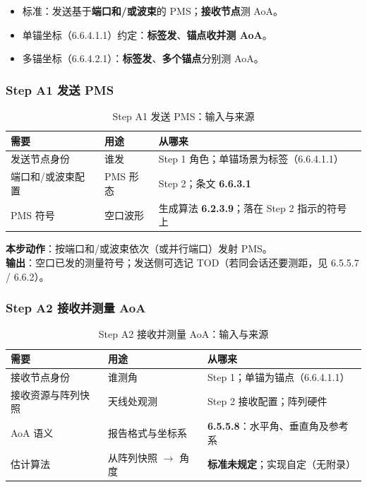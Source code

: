 \documentclass[11pt,a4paper]{ctexart}
\begin{document}
\begin{itemize}[nosep]
  \item 标准：发送基于\textbf{端口和/或波束}的 PMS；\textbf{接收节点}测 AoA。
  \item 单锚坐标（6.6.4.1.1）约定：\textbf{标签发}、\textbf{锚点收并测 AoA}。
  \item 多锚坐标（6.6.4.2.1）：\textbf{标签发}、\textbf{多个锚点}分别测 AoA。
\end{itemize}

\subsubsection{Step A1 发送 PMS}

\begin{longtable}{L{3.2cm}L{5.0cm}L{4.8cm}}
\caption{Step A1 发送 PMS：输入与来源\label{tab:step114}} \\
\toprule
\textbf{需要} & \textbf{用途} & \textbf{从哪来} \\
\midrule
发送节点身份 & 谁发 & Step 1 角色；单锚场景为标签（6.6.4.1.1） \\
端口和/或波束配置 & PMS 形态 & Step 2；条文 \textbf{6.6.3.1} \\
PMS 符号 & 空口波形 & 生成算法 \textbf{6.2.3.9}；落在 Step 2 指示的符号上 \\
\bottomrule
\end{longtable}

\textbf{本步动作}：按端口和/或波束依次（或并行端口）发射 PMS。\\
\textbf{输出}：空口已发的测量符号；发送侧可选记 TOD（若同会话还要测距，见 6.5.5.7 / 6.6.2）。

\subsubsection{Step A2 接收并测量 AoA}

\begin{longtable}{L{3.2cm}L{5.0cm}L{4.8cm}}
\caption{Step A2 接收并测量 AoA：输入与来源\label{tab:step115}} \\
\toprule
\textbf{需要} & \textbf{用途} & \textbf{从哪来} \\
\midrule
接收节点身份 & 谁测角 & Step 1；单锚为锚点（6.6.4.1.1） \\
接收资源与阵列快照 & 天线处观测 & Step 2 接收配置；阵列硬件 \\
AoA 语义 & 报告格式与坐标系 & \textbf{6.5.5.8}：水平角、垂直角及参考系 \\
估计算法 & 从阵列快照 $\rightarrow$ 角度 & \textbf{标准未规定}；实现自定（无附录） \\
\bottomrule
\end{longtable}
\end{document}
